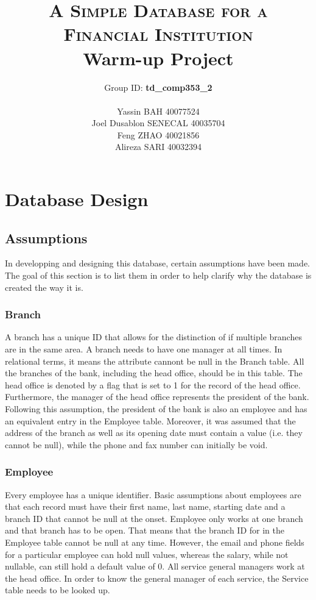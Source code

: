 \documentclass[letterpaper, 12pt]{article}
\title{
  \textsc{\huge A Simple Database for a Financial Institution}\\
  Warm-up Project
  \vspace*{4em}
}
\author{
  Group ID: \textbf{td\_comp353\_2}\\\\
  Yassin BAH 40077524\\
  Joel Dusablon SENECAL 40035704\\
  Feng ZHAO 40021856\\
  Alireza SARI 40032394\\ 
  \vspace*{6em}
}
\begin{document}
\maketitle
\newpage


\section{Database Design}
\subsection{Assumptions}
In developping and designing this database, certain assumptions have been made.
The goal of this section is to list them in order to help clarify why the database is created the way it is.

\subsubsection{Branch}
A branch has a unique ID that allows for the distinction of if multiple branches are in the same area.
A branch needs to have one manager at all times.
In relational terms, it means the attribute cannont be null in the Branch table.
All the branches of the bank, including the head office, should be in this table.
The head office is denoted by a flag that is set to 1 for the record of the head office.
Furthermore, the manager of the head office represents the president of the bank.
Following this assumption, the president of the bank is also an employee and has an equivalent entry in the Employee table.
Moreover, it was assumed that the address of the branch as well as its opening date must contain a value (i.e. they cannot be null), while the phone and fax number can initially be void.   

\subsubsection{Employee}
Every employee has a unique identifier.
Basic assumptions about employees are that each record must have their first name, last name, starting date and a branch ID that cannot be null at the onset.
Employee only works at one branch and that branch has to be open.
That means that the branch ID for in the Employee table cannot be null at any time.
However, the email and phone fields for a particular employee can hold null values, whereas the salary, while not nullable, can still hold a default value of 0. 
All service general managers work at the head office.
In order to know the general manager of each service, the Service table needs to be looked up.
\end{document}
